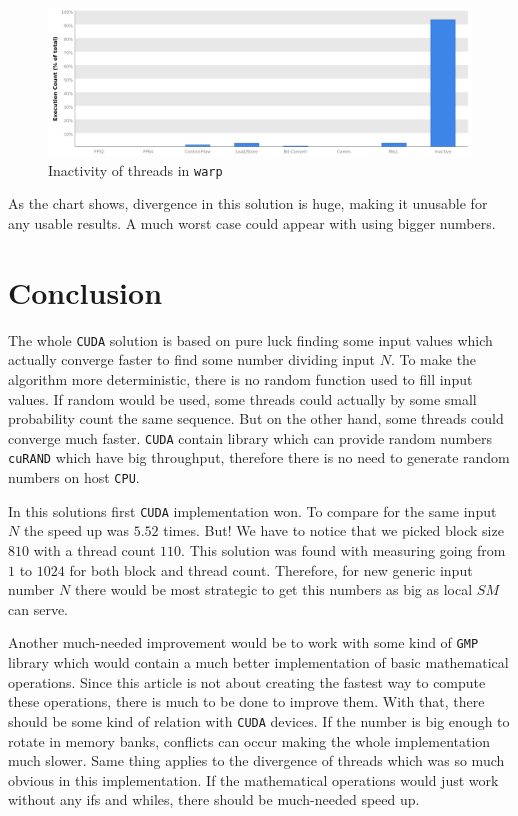 \documentclass[a4paper]{article}
\begin{document}
\begin{figure}[H]
  \centering
    \includegraphics[width=1\textwidth]{inactive2.png}
  \caption{Inactivity of threads in \texttt{warp}}
  \label{inactive2}
\end{figure}

As the chart shows, divergence in this solution is huge, making it unusable for any usable results. A much worst case could appear with using bigger numbers.

\section{Conclusion}

The whole \texttt{CUDA} solution is based on pure luck finding some input values which actually converge faster to find some number dividing input $N$. To make the algorithm more deterministic, there is no random function used to fill input values. If random would be used, some threads could actually by some small probability count the same sequence. But on the other hand, some threads could converge much faster. \texttt{CUDA} contain library which can provide random numbers \texttt{cuRAND} \cite{cuRAND} which have big throughput, therefore there is no need to generate random numbers on host \texttt{CPU}.

In this solutions first \texttt{CUDA} implementation won. To compare for the same input $N$ the speed up was $5.52$ times. But! We have to notice that we picked block size $810$ with a thread count $110$. This solution was found with measuring going from $1$ to $1024$ for both block and thread count. Therefore, for new generic input number $N$ there would be most strategic to get this numbers as big as local $SM$ can serve.

Another much-needed improvement would be to work with some kind of \texttt{GMP} library which would contain a much better implementation of basic mathematical operations. Since this article is not about creating the fastest way to compute these operations, there is much to be done to improve them. With that, there should be some kind of relation with \texttt{CUDA} devices. If the number is big enough to rotate in memory banks, conflicts can occur making the whole implementation much slower. Same thing applies to the divergence of threads which was so much obvious in this implementation. If the mathematical operations would just work without any ifs and whiles, there should be much-needed speed up.




\end{document}

